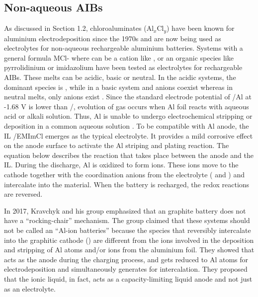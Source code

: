 \subsection{Non-aqueous AIBs}
As discussed in Section 1.2, chloroaluminates (Al$_x$Cl$_y$) have been known for aluminium electrodeposition since the 1970s and are now being used as electrolytes for non-aqueous rechargeable aluminium batteries\cite{weppner_ionic_1976, fung_reaction_1972}. Systems with a general formula MCl- where  can be a cation like ,  or an organic species like pyrrolidinium or imidazolium have been tested as electrolytes for rechargeable AIBs\cite{das_aluminium-ion_2017}. These melts can be acidic, basic or neutral. In the acidic systems, the dominant species is , while in a basic system  and  anions coexist whereas in neutral melts, only  anions exist \cite{galinski_ionic_2006,holbrey_ionic_1999}. Since the standard electrode potential of /Al at -1.68 V is lower than /, evolution of  gas occurs when Al foil reacts with aqueous acid or alkali solution. Thus, Al is unable to undergo electrochemical stripping or deposition in a common aqueous solution \cite{wu_electrochemically_2019}. To be compatible with Al anode, the IL /EMImCl emerges as the typical electrolyte. It provides a mild corrosive effect on the anode surface to activate the Al striping and plating reaction. The equation below describes the reaction that takes place between the anode and the IL. During the discharge, Al is oxidized to form  ions. These ions move to the cathode together with the coordination anions from the electrolyte ( and ) and intercalate into the material. When the battery is recharged, the redox reactions are reversed.

In 2017, Kravchyk and his group emphasized that an  graphite battery does not have a \enquote{rocking-chair} mechanism. The group claimed that these systems should not be called an \enquote{Al-ion batteries} because the species that reversibly intercalate into the graphitic cathode () are different from the ions involved in the deposition and stripping of Al atoms and/or  ions from the aluminium foil. They showed that  acts as the anode during the charging process, and gets reduced to Al atoms for electrodeposition and simultaneously generates  for intercalation. They proposed that the ionic liquid, in fact, acts as a capacity-limiting liquid anode and not just as an electrolyte.


